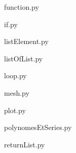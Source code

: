 
\begin{figure}
\caption{function.py}
\end{figure}

\begin{figure}
\caption{if.py}
\end{figure}

\begin{figure}
\caption{listElement.py}
\end{figure}

\begin{figure}
\caption{listOfList.py}
\end{figure}

\begin{figure}
\caption{loop.py}
\end{figure}

\begin{figure}
\caption{mesh.py}
\end{figure}

\begin{figure}
\caption{plot.py}
\end{figure}

\begin{figure}
\caption{polynomesEtSeries.py}
\end{figure}

\begin{figure}
\caption{returnList.py}
\end{figure}
\pagebreak
